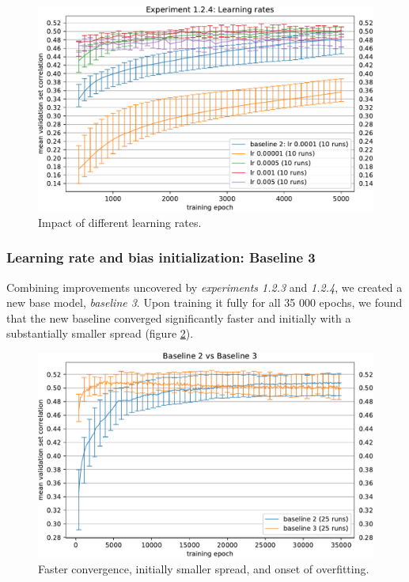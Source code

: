 \begin{figure}[H]
    \centering
    \includegraphics[width=1\textwidth]{../figures/05_1_2_4}
    \caption[Experiment 1.2.4]{Impact of different learning rates.}
    \label{fig:5.1.2.4}
\end{figure}

\subsubsection{Learning rate and bias initialization: Baseline 3}\label{ex:1.2.5}

Combining improvements uncovered by \emph{experiments 1.2.3} and \emph{1.2.4}, we created a new base model, \emph{baseline 3}. Upon training it fully for all 35 000 epochs, we found that the new baseline converged significantly faster and initially with a substantially smaller spread (figure \ref{fig:5.1.2.5}). 

\begin{figure}[H]
    \centering
    \includegraphics[width=1\textwidth]{../figures/05_1_2_5}
    \caption[Experiment 1.2.5]{Faster convergence, initially smaller spread, and onset of overfitting.}
    \label{fig:5.1.2.5}
\end{figure}

